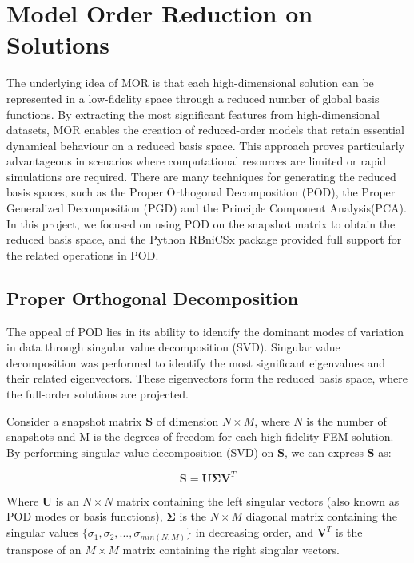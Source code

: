 \section{Model Order Reduction on Solutions}
The underlying idea of MOR is that each high-dimensional solution can be represented in a low-fidelity space through a reduced number of global basis functions. By extracting the most significant features from high-dimensional datasets, MOR enables the creation of reduced-order models that retain essential dynamical behaviour on a reduced basis space. This approach proves particularly advantageous in scenarios where computational resources are limited or rapid simulations are required. There are many techniques for generating the reduced basis spaces, such as the Proper Orthogonal Decomposition (POD), the Proper Generalized Decomposition (PGD) and the Principle Component Analysis(PCA). In this project, we focused on using POD on the snapshot matrix to obtain the reduced basis space, and the Python RBniCSx package provided full support for the related operations in POD. 

\subsection{Proper Orthogonal Decomposition}

The appeal of POD lies in its ability to identify the dominant modes of variation in data through singular value decomposition (SVD). Singular value decomposition was performed to identify the most significant eigenvalues and their related eigenvectors. These eigenvectors form the reduced basis space, where the full-order solutions are projected.  

Consider a snapshot matrix $\mathbf{S}$ of dimension $N \times M$, where $N$ is the number of snapshots and M is the degrees of freedom for each high-fidelity FEM solution. By performing singular value decomposition (SVD) on $\mathbf{S}$, we can express $\mathbf{S}$ as:

\begin{equation}
    \mathbf{S} = \mathbf{U}\mathbf{\Sigma}\mathbf{V}^T
    \label{eqn:SVD}
\end{equation}

Where $\mathbf{U}$ is an $N \times N$ matrix containing the left singular vectors (also known as POD modes or basis functions), $\mathbf{\Sigma}$ is the $N \times M$ diagonal matrix containing the singular values $\{\sigma_1, \sigma_2,...,\sigma_{min(N,M)}\}$ in decreasing order, and $\mathbf{V}^T$ is the transpose of an $M \times M$ matrix containing the right singular vectors.

